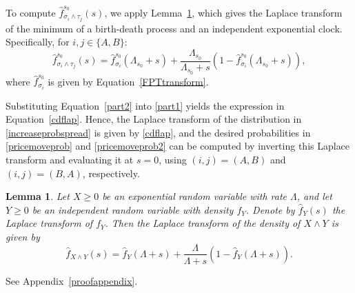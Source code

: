\documentclass[11pt]{article}
\newtheorem{lemma}{Lemma}
\newenvironment{proof}{\noindent{\it Proof.}}{\hfill\fbox{}\vspace*{1mm}}
\begin{document}
\begin{proof}
\begin{itemize}
To compute $\hat{f}^{s_0}_{\sigma_i \wedge \tau_j}(s)$, we apply Lemma~\ref{LTminofexponential}, which gives the Laplace transform of the minimum of a birth-death process and an independent exponential clock. Specifically, for $i, j \in \{A, B\}$:
\begin{equation}\label{part2}
    \hat{f}^{s_0}_{\sigma_i \wedge \tau_j}(s)
    = \hat{f}^{s_0}_{\sigma_i}(\Lambda_{s_0} + s) + \frac{\Lambda_{s_0}}{\Lambda_{s_0} + s} \left(1 - \hat{f}^{s_0}_{\sigma_i}(\Lambda_{s_0} + s) \right),
\end{equation}
where $\hat{f}^{s_0}_{\sigma_i}$ is given by Equation~\eqref{FPTtransform}.

Substituting Equation~\eqref{part2} into \eqref{part1} yields the expression in Equation~\eqref{cdflap}. Hence, the Laplace transform of the distribution in \eqref{increaseprobspread} is given by \eqref{cdflap}, and the desired probabilities in \eqref{pricemoveprob} and \eqref{pricemoveprob2} can be computed by inverting this Laplace transform and evaluating it at $s = 0$, using $(i, j) = (A, B)$ and $(i, j) = (B, A)$, respectively.
\end{itemize}
\end{proof}


\begin{lemma} \label{LTminofexponential}
Let \( X \geq 0 \) be an exponential random variable with rate \( \Lambda \), and let \( Y \geq 0 \) be an independent random variable with density \( f_Y \). Denote by \( \hat{f}_Y(s) \) the Laplace transform of \( f_Y \). Then the Laplace transform of the density of \( X \wedge Y \) is given by
\begin{equation}
\hat{f}_{X \wedge Y}(s) = \hat{f}_Y(\Lambda + s) + \frac{\Lambda}{\Lambda + s} \left(1 - \hat{f}_Y(\Lambda + s) \right).
\end{equation}
\end{lemma}

\begin{proof}
See Appendix~\ref{proofappendix}.
\end{proof}
\end{document}
